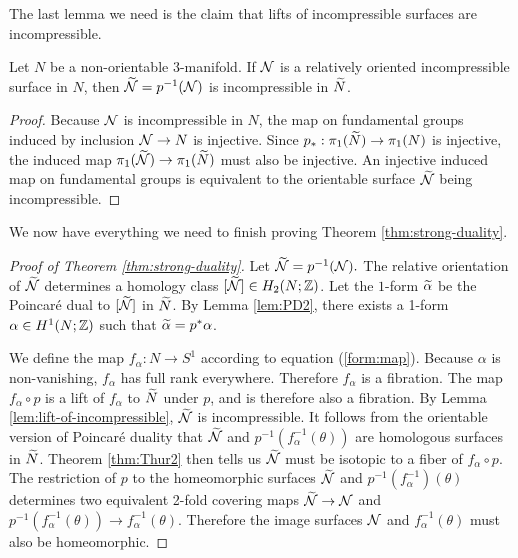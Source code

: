 The last lemma we need is the claim that lifts of incompressible surfaces are incompressible.
\begin{lem}
  \label{lem:lift-of-incompressible}
  Let $N$ be a non-orientable 3-manifold.  If $\mathcal{N}$ is a relatively oriented incompressible surface in $N$, then $\widetilde{\mathcal{N}}=p^{-1}(\mathcal{N})$ is incompressible in $\widetilde{N}$.
\end{lem}
\begin{proof}
  Because $\mathcal{N}$ is incompressible in $N$, the map on fundamental groups induced by inclusion $\mathcal{N}\rightarrow N$ is injective.
Since $p_\ast:\pi_1(\widetilde{N})\rightarrow\pi_1(N)$ is injective, the induced map $\pi_1(\widetilde{\mathcal{N}}) \to \pi_1(\widetilde{N})$ must also be injective.  An injective induced map on fundamental groups is equivalent to the orientable surface $\widetilde{\mathcal{N}}$ being incompressible.
\end{proof}


We now have everything we need to finish proving Theorem \ref{thm:strong-duality}.
\begin{proof}[Proof of Theorem \ref{thm:strong-duality}]
  Let $\widetilde{\mathcal{N}}=p^{-1}(\mathcal{N}).$
  The relative orientation of $\widetilde{\mathcal{N}}$ determines a homology class $[\widetilde{\mathcal{N}}]\in H_2(N;\mathbb{Z})$.  Let the $1$-form $\widetilde{\alpha}$ be the Poincar\'e dual to $[\widetilde{\mathcal{N}}]$ in $\widetilde{N}$.
  By Lemma \ref{lem:PD2}, there exists a 1-form $\alpha\in H^1(N;\mathbb{Z})$ such that $\widetilde{\alpha}=p^\ast\alpha$.  %

We define the map $f_\alpha:N\rightarrow S^1$ according to equation (\ref{form:map}).  Because $\alpha$ is non-vanishing, $f_{\alpha}$ has full rank everywhere.  Therefore $f_\alpha$ is a fibration.
The map $f_{\alpha} \circ p$ is a lift of $f_{\alpha}$ to $\widetilde{N}$ under $p$, and is therefore also a fibration.
  By Lemma \ref{lem:lift-of-incompressible}, $\widetilde{\mathcal{N}}$ is incompressible.
It follows from the orientable version of Poincar\'e duality that $\widetilde{\mathcal{N}}$ and $p^{-1}(f_{\alpha}^{-1}(\theta))$ are homologous surfaces in $\widetilde{N}$.    Theorem \ref{thm:Thur2} then tells us $\widetilde{\mathcal{N}}$ must be isotopic to a fiber of $f_{\alpha} \circ p$.
  The restriction of $p$ to the homeomorphic surfaces $\widetilde{\mathcal{N}}$ and $p^{-1}(f_{\alpha}^{-1})(\theta)$ determines two equivalent 2-fold covering maps $\widetilde{\mathcal{N}}\rightarrow \mathcal{N}$ and  $p^{-1}(f^{-1}_{\alpha}(\theta))\rightarrow f^{-1}_\alpha(\theta)$.  Therefore the image surfaces $\mathcal{N}$ and $f_{\alpha}^{-1}(\theta)$ must also be homeomorphic.
\end{proof}

